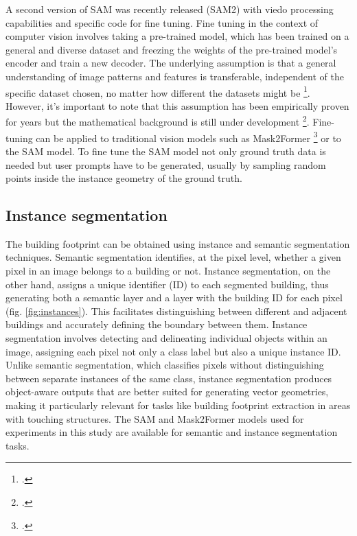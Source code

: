 \begin{refsection}
A second version of SAM was recently released (SAM2) with viedo processing capabilities and specific code for fine tuning. Fine tuning in the context of computer vision involves taking 
a pre-trained model, which has been trained on a general and diverse 
dataset and freezing the weights of the pre-trained 
model's encoder and train a new decoder. The underlying assumption 
is that a general understanding of image patterns and features is 
transferable, independent of the specific dataset chosen, no matter 
how different the datasets might be 
\footcite{zhuang_comprehensive_2021}. However, it's 
important to note that this assumption has been empirically proven for years but the mathematical background is still under development \footcite{cao_feasibility_2023}. Fine-tuning can be applied to traditional vision models such as Mask2Former \footcite{cheng_masked-attention_2022} or to the SAM model. To fine tune the SAM model not only ground truth data is needed but user prompts have to be generated, usually by sampling random points inside the instance geometry of the ground truth.

\subsection{Instance segmentation}
\label{sec:instance_seg_bg}

The building footprint can be obtained using instance and semantic segmentation techniques. Semantic segmentation identifies, at the pixel level, whether a given pixel in an image belongs to a building or not. Instance segmentation, on the other hand, assigns a unique identifier (ID) to each segmented building, thus generating both a semantic layer and a layer with the building ID for each pixel (fig. \ref{fig:instances}). This facilitates distinguishing between different and adjacent buildings and accurately defining the boundary between them. Instance segmentation involves detecting and delineating individual objects within an image, assigning each pixel not only a class label but also a unique instance ID. Unlike semantic segmentation, which classifies pixels without distinguishing between separate instances of the same class, instance segmentation produces object-aware outputs that are better suited for generating vector geometries, making it particularly relevant for tasks like building footprint extraction in areas with touching structures. The SAM and Mask2Former models used for experiments in this study are available for semantic and instance segmentation tasks.


\end{refsection}
